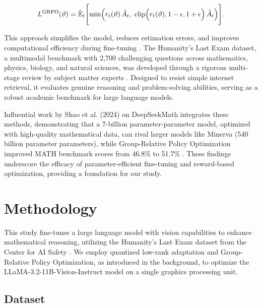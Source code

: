 \documentclass{svproc}
\begin{document}
\begin{equation}
  L^{\text{GRPO}}(\vartheta) = \hat{\mathbb{E}}_t \Biggl[ \min\Bigl( r_t(\vartheta)\, \hat{A}_t,\; \text{clip}\Bigl(r_t(\vartheta), 1-\epsilon, 1+\epsilon\Bigr)\, \hat{A}_t \Bigr) \Biggr].
\end{equation}

This approach simplifies the model, reduces estimation errors, and improves computational efficiency during fine-tuning \cite{shao2024deepseekmathpushinglimitsmathematical}. The Humanity's Last Exam dataset, a multimodal benchmark with 2,700 challenging questions across mathematics, physics, biology, and natural sciences, was developed through a rigorous multi-stage review by subject matter experts \cite{phan2025humanitysexam}. Designed to resist simple internet retrieval, it evaluates genuine reasoning and problem-solving abilities, serving as a robust academic benchmark for large language models.

Influential work by Shao et al. (2024) on DeepSeekMath integrates these methods, demonstrating that a 7-billion parameter-parameter model, optimized with high-quality mathematical data, can rival larger models like Minerva (540 billion parameter parameters), while Group-Relative Policy Optimization improved MATH benchmark scores from 46.8\% to 51.7\% \cite{shao2024deepseekmathpushinglimitsmathematical}. These findings underscore the efficacy of parameter-efficient fine-tuning and reward-based optimization, providing a foundation for our study.


\section{Methodology}

This study fine-tunes a large language model with vision capabilities to enhance mathematical reasoning, utilizing the Humanity's Last Exam dataset from the Center for AI Safety \cite{phan2025humanitysexam}. We employ quantized low-rank adaptation and Group-Relative Policy Optimization, as introduced in the background, to optimize the LLaMA-3.2-11B-Vision-Instruct model on a single graphics processing unit.

\subsection{Dataset}
\end{document}
